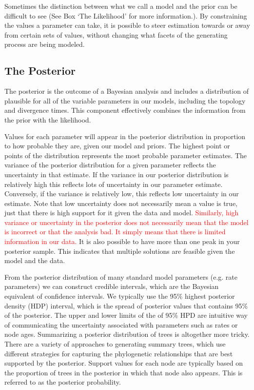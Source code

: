 \documentclass[11pt]{article}
\newcommand{\rw}[1]{{\textcolor{red}{[RW: #1]}}} %
\newcommand{\edit}[1]{{\textcolor{red}{#1}}} %
\newcommand{\aw}[1]{{\textcolor{armygreen}{[AW: #1]}}} %
\begin{document}
Sometimes the distinction between what we call a model and the prior can be difficult to see (See Box `The Likelihood' for more information.).
By constraining the values a parameter can take, it is possible to steer estimation towards or away from certain sets of values, without changing what facets of the generating process are being modeled. 

\subsection{The Posterior}

The posterior is the outcome of a Bayesian analysis and includes a distribution of plausible for all of the variable parameters in our models, including the topology and divergence times.
This component effectively combines the information from the prior with the likelihood. %

Values for each parameter will appear in the posterior distribution in proportion to how probable they are, given our model and priors.
The highest point or points of the distribution represents the most probable parameter estimates.
The variance of the posterior distribution for a given parameter reflects the uncertainty in that estimate.
If the variance in our posterior distribution is relatively high this reflects lots of uncertainty in our parameter estimate.
Conversely, if the variance is relatively low, this reflects low uncertainty in our estimate.
Note that low uncertainty does not necessarily mean a value is true, just that there is high support for it given the data and model.
\edit{Similarly, high variance or uncertainty in the posterior does not necessarily mean that the model is incorrect or that the analysis bad. It simply means that there is limited information in our data.} 
It is also possible to have more than one peak in your posterior sample.
This indicates that multiple solutions are feasible given the model and the data.

From the posterior distribution of many standard model parameters (e.g. rate parameters) we can construct credible intervals, which are the Bayesian equivalent of confidence intervals.  
We typically use the 95\% highest posterior density (HDP) interval, which is the spread of posterior values that contains 95\% of the posterior.
The upper and lower limits of the of 95\% HPD are intuitive way of communicating the uncertainty associated with parameters such as rates or node ages.
Summarizing a posterior distribution of trees is altogether more tricky.
There are a variety of approaches to generating summary trees, which use different strategies for capturing the phylogenetic relationships that are best supported by the posterior.
Support values for each node are typically based on the proportion of trees in the posterior in which that node also appears. 
This is referred to as the posterior probability. 
\end{document}
